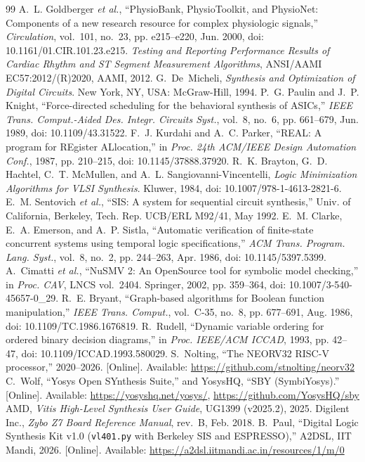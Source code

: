 \documentclass[11pt,a4paper]{article}
\begin{document}
\begin{thebibliography}{99}
 A.~L. Goldberger \emph{et al.}, ``{PhysioBank}, {PhysioToolkit}, and {PhysioNet}: Components of a new research resource for complex physiologic signals,'' \emph{Circulation}, vol.~101, no.~23, pp. e215--e220, Jun. 2000, doi: 10.1161/01.CIR.101.23.e215.
 \emph{Testing and Reporting Performance Results of Cardiac Rhythm and {ST} Segment Measurement Algorithms}, ANSI/AAMI EC57:2012/(R)2020, AAMI, 2012.
 G.~De~Micheli, \emph{Synthesis and Optimization of Digital Circuits}. New York, NY, USA: McGraw-Hill, 1994.
 P.~G. Paulin and J.~P. Knight, ``Force-directed scheduling for the behavioral synthesis of {ASICs},'' \emph{IEEE Trans. Comput.-Aided Des. Integr. Circuits Syst.}, vol.~8, no.~6, pp. 661--679, Jun. 1989, doi: 10.1109/43.31522.
 F.~J. Kurdahi and A.~C. Parker, ``{REAL}: A program for {REgister ALlocation},'' in \emph{Proc. 24th ACM/IEEE Design Automation Conf.}, 1987, pp. 210--215, doi: 10.1145/37888.37920.
 R.~K. Brayton, G.~D. Hachtel, C.~T. McMullen, and A.~L. Sangiovanni-Vincentelli, \emph{Logic Minimization Algorithms for {VLSI} Synthesis}. Kluwer, 1984, doi: 10.1007/978-1-4613-2821-6.
 E.~M. Sentovich \emph{et al.}, ``{SIS}: A system for sequential circuit synthesis,'' Univ. of California, Berkeley, Tech. Rep. UCB/ERL M92/41, May 1992.
 E.~M. Clarke, E.~A. Emerson, and A.~P. Sistla, ``Automatic verification of finite-state concurrent systems using temporal logic specifications,'' \emph{ACM Trans. Program. Lang. Syst.}, vol.~8, no.~2, pp. 244--263, Apr. 1986, doi: 10.1145/5397.5399.
 A.~Cimatti \emph{et al.}, ``{NuSMV} 2: An {OpenSource} tool for symbolic model checking,'' in \emph{Proc. CAV}, LNCS vol.~2404. Springer, 2002, pp. 359--364, doi: 10.1007/3-540-45657-0\_29.
 R.~E. Bryant, ``Graph-based algorithms for {Boolean} function manipulation,'' \emph{IEEE Trans. Comput.}, vol.~C-35, no.~8, pp. 677--691, Aug. 1986, doi: 10.1109/TC.1986.1676819.
 R.~Rudell, ``Dynamic variable ordering for ordered binary decision diagrams,'' in \emph{Proc. IEEE/ACM ICCAD}, 1993, pp. 42--47, doi: 10.1109/ICCAD.1993.580029.
 S.~Nolting, ``The {NEORV32} {RISC-V} processor,'' 2020--2026. [Online]. Available: \url{https://github.com/stnolting/neorv32}
 C.~Wolf, ``Yosys Open SYnthesis Suite,'' and YosysHQ, ``SBY (SymbiYosys).'' [Online]. Available: \url{https://yosyshq.net/yosys/}, \url{https://github.com/YosysHQ/sby}
 AMD, \emph{Vitis High-Level Synthesis User Guide}, UG1399 (v2025.2), 2025.
 Digilent Inc., \emph{Zybo Z7 Board Reference Manual}, rev.~B, Feb. 2018.
 B.~Paul, ``Digital Logic Synthesis Kit v1.0 (\texttt{vl401.py} with Berkeley SIS and ESPRESSO),'' A2DSL, IIT Mandi, 2026. [Online]. Available: \url{https://a2dsl.iitmandi.ac.in/resources/1/m/0}
\end{thebibliography}
\end{document}
